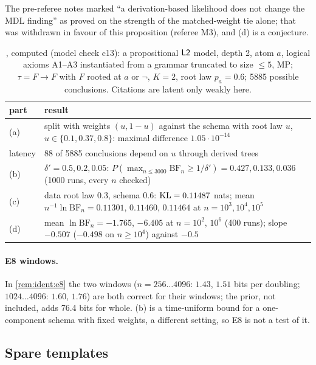The pre-referee notes marked ``a derivation-based likelihood does not change the MDL finding'' as proved on the strength of the matched-weight tie alone; that was withdrawn in favour of this proposition (referee M3), and (d) is a conjecture.

\begin{table}[ht]
\centering\small
\begin{tabular}{@{}lp{11.5cm}@{}}
\toprule
part & result\\
\midrule
(a) & split with weights $(u,1-u)$ against the schema with root law $u$, $u\in\{0.1,0.37,0.8\}$: maximal difference $1.05\cdot10^{-14}$\\
latency & 88 of 5885 conclusions depend on $u$ through derived trees\\
(b) & $\delta'=0.5,0.2,0.05$: $P(\max_{n\le3000}\mathrm{BF}_n\ge1/\delta')=0.427,0.133,0.036$ (1000 runs, every $n$ checked)\\
(c) & data root law $0.3$, schema $0.6$: $\mathrm{KL}=0.11487$ nats; mean $n^{-1}\ln\mathrm{BF}_n=0.11301$, $0.11460$, $0.11464$ at $n=10^3,10^4,10^5$\\
(d) & mean $\ln\mathrm{BF}_n=-1.765$, $-6.405$ at $n=10^2$, $10^6$ (400 runs); slope $-0.507$ ($-0.498$ on $n\ge10^4$) against $-0.5$\\
\bottomrule
\end{tabular}
\caption{, computed (model check c13): a propositional $\mathord{\mathsf{L2}}$ model, depth 2, atom $a$, logical axioms A1--A3 instantiated from a grammar truncated to size $\le5$, MP; $\tau=F\to F$ with $F$ rooted at $a$ or $\neg$, $K=2$, root law $p_a=0.6$; 5885 possible conclusions. Citations are latent only weakly here.}
\label{tab:ident:c13}
\end{table}

\paragraph{E8 windows.} In \cref{rem:ident:e8} the two windows ($n=256\ldots4096$: $1.43$, $1.51$ bits per doubling; $1024\ldots4096$: $1.60$, $1.76$) are both correct for their windows; the prior, not included, adds 76.4 bits for whole. (b) is a time-uniform bound for a one-component schema with fixed weights, a different setting, so E8 is not a test of it.

\subsection{Spare templates}\label{app:ident:spare}

